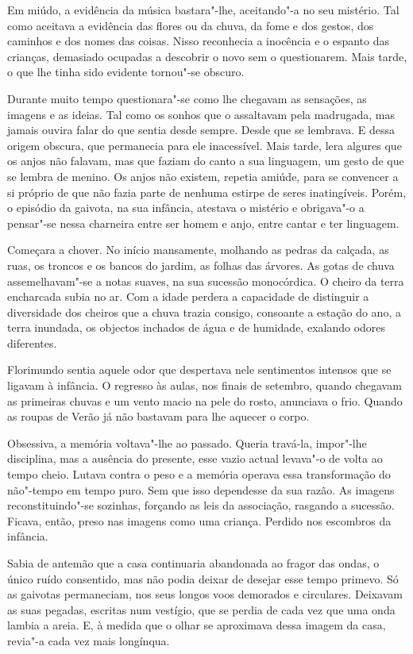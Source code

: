 Em miúdo, a evidência da música bastara"-lhe, aceitando"-a no seu
mistério. Tal como aceitava a evidência das flores ou da chuva, da fome
e dos gestos, dos caminhos e dos nomes das coisas. Nisso reconhecia a
inocência e o espanto das crianças, demasiado ocupadas a descobrir o
novo sem o questionarem. Mais tarde, o que lhe tinha sido evidente
tornou"-se obscuro.

Durante muito tempo questionara"-se como lhe chegavam as sensações, as
imagens e as ideias. Tal como os sonhos que o assaltavam pela madrugada,
mas jamais ouvira falar do que sentia desde sempre. Desde que se
lembrava. E dessa origem obscura, que permanecia para ele inacessível.
Mais tarde, lera algures que os anjos não falavam, mas que faziam do
canto a sua linguagem, um gesto de que se lembra de menino. Os anjos não
existem, repetia amiúde, para se convencer a si próprio de que não fazia
parte de nenhuma estirpe de seres inatingíveis. Porém, o episódio da
gaivota, na sua infância, atestava o mistério e obrigava"-o a pensar"-se
nessa charneira entre ser homem e anjo, entre cantar e ter linguagem.

Começara a chover. No início mansamente, molhando as pedras da calçada,
as ruas, os troncos e os bancos do jardim, as folhas das árvores. As
gotas de chuva assemelhavam"-se a notas suaves, na sua sucessão
monocórdica. O cheiro da terra encharcada subia no ar. Com a idade
perdera a capacidade de distinguir a diversidade dos cheiros que a chuva
trazia consigo, consoante a estação do ano, a terra inundada, os
objectos inchados de água e de humidade, exalando odores diferentes.

Florimundo sentia aquele odor que despertava nele sentimentos intensos
que se ligavam à infância. O regresso às aulas, nos finais de setembro,
quando chegavam as primeiras chuvas e um vento macio na pele do rosto,
anunciava o frio. Quando as roupas de Verão já não bastavam para lhe
aquecer o corpo.

Obsessiva, a memória voltava"-lhe ao passado. Queria travá-la, impor"-lhe
disciplina, mas a ausência do presente, esse vazio actual levava"-o de
volta ao tempo cheio. Lutava contra o peso e a memória operava essa
transformação do não"-tempo em tempo puro. Sem que isso dependesse da sua
razão. As imagens reconstituindo"-se sozinhas, forçando as leis da
associação, rasgando a sucessão. Ficava, então, preso nas imagens como
uma criança. Perdido nos escombros da infância.

Sabia de antemão que a casa continuaria abandonada ao fragor das ondas,
o único ruído consentido, mas não podia deixar de desejar esse tempo
primevo. Só as gaivotas permaneciam, nos seus longos voos demorados e
circulares. Deixavam as suas pegadas, escritas num vestígio, que se
perdia de cada vez que uma onda lambia a areia. E, à medida que o olhar
se aproximava dessa imagem da casa, revia"-a cada vez mais longínqua.

